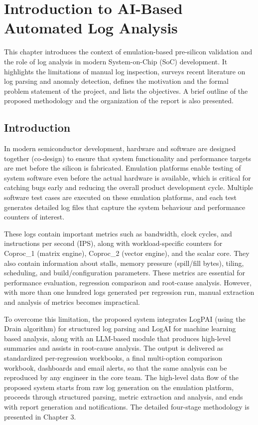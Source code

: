 \chapter{Introduction to AI-Based Automated Log Analysis}
This chapter introduces the context of emulation-based pre-silicon validation and the role of log analysis in modern System-on-Chip (SoC) development. It highlights the limitations of manual log inspection, surveys recent literature on log parsing and anomaly detection, defines the motivation and the formal problem statement of the project, and lists the objectives. A brief outline of the proposed methodology and the organization of the report is also presented.

\section[Introduction]{\textbf{Introduction}}
In modern semiconductor development, hardware and software are designed together (co-design) to ensure that system functionality and performance targets are met before the silicon is fabricated. Emulation platforms enable testing of system software even before the actual hardware is available, which is critical for catching bugs early and reducing the overall product development cycle. Multiple software test cases are executed on these emulation platforms, and each test generates detailed log files that capture the system behaviour and performance counters of interest.

These logs contain important metrics such as bandwidth, clock cycles, and instructions per second (IPS), along with workload-specific counters for Coproc\_1 (matrix engine), Coproc\_2 (vector engine), and the scalar core. They also contain information about stalls, memory pressure (spill/fill bytes), tiling, scheduling, and build/configuration parameters. These metrics are essential for performance evaluation, regression comparison and root-cause analysis. However, with more than one hundred logs generated per regression run, manual extraction and analysis of metrics becomes impractical.

To overcome this limitation, the proposed system integrates LogPAI (using the Drain algorithm) for structured log parsing and LogAI for machine learning based analysis, along with an LLM-based module that produces high-level summaries and assists in root-cause analysis. The output is delivered as standardized per-regression workbooks, a final multi-option comparison workbook, dashboards and email alerts, so that the same analysis can be reproduced by any engineer in the core team. The high-level data flow of the proposed system starts from raw log generation on the emulation platform, proceeds through structured parsing, metric extraction and analysis, and ends with report generation and notifications. The detailed four-stage methodology is presented in Chapter 3.


